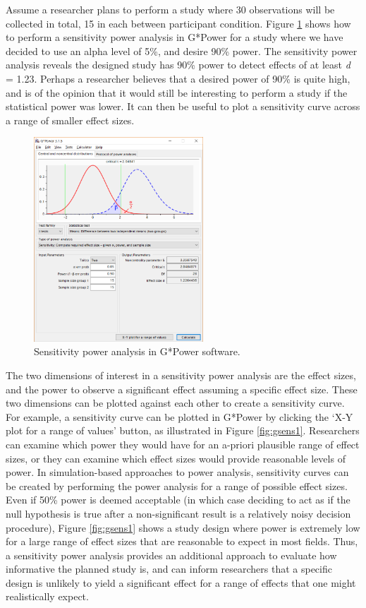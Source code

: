 \documentclass[
  english,
  ,jou, a4paper,floatsintext]{apa6}
\begin{document}
Assume a researcher plans to perform a study where 30 observations will be collected in total, 15 in each between participant condition. Figure \ref{fig:gsens0} shows how to perform a sensitivity power analysis in G*Power for a study where we have decided to use an alpha level of 5\%, and desire 90\% power. The sensitivity power analysis reveals the designed study has 90\% power to detect effects of at least \emph{d} = 1.23. Perhaps a researcher believes that a desired power of 90\% is quite high, and is of the opinion that it would still be interesting to perform a study if the statistical power was lower. It can then be useful to plot a sensitivity curve across a range of smaller effect sizes.

\begin{figure}
\includegraphics[width=240px]{images/gpow_sensitivity_1} \caption{Sensitivity power analysis in G*Power software.}\label{fig:gsens0}
\end{figure}

The two dimensions of interest in a sensitivity power analysis are the effect sizes, and the power to observe a significant effect assuming a specific effect size. These two dimensions can be plotted against each other to create a sensitivity curve. For example, a sensitivity curve can be plotted in G*Power by clicking the `X-Y plot for a range of values' button, as illustrated in Figure \ref{fig:gsens1}. Researchers can examine which power they would have for an a-priori plausible range of effect sizes, or they can examine which effect sizes would provide reasonable levels of power. In simulation-based approaches to power analysis, sensitivity curves can be created by performing the power analysis for a range of possible effect sizes. Even if 50\% power is deemed acceptable (in which case deciding to act as if the null hypothesis is true after a non-significant result is a relatively noisy decision procedure), Figure \ref{fig:gsens1} shows a study design where power is extremely low for a large range of effect sizes that are reasonable to expect in most fields. Thus, a sensitivity power analysis provides an additional approach to evaluate how informative the planned study is, and can inform researchers that a specific design is unlikely to yield a significant effect for a range of effects that one might realistically expect.
\end{document}
